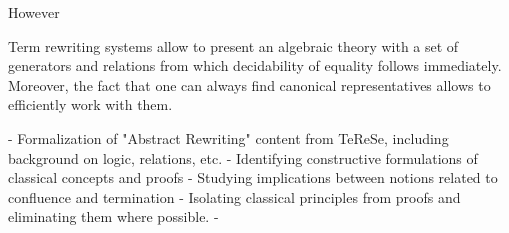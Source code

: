 However

Term rewriting systems allow to present an algebraic theory with a
set of generators and relations from which decidability of equality
follows immediately.
Moreover, the fact that one can always find canonical representatives
allows to efficiently work with them.


- Formalization of "Abstract Rewriting" content from TeReSe,
including background on logic, relations, etc.
- Identifying constructive formulations of classical concepts and proofs
- Studying implications between notions related to confluence and termination
- Isolating classical principles from proofs and eliminating them where possible.
-
